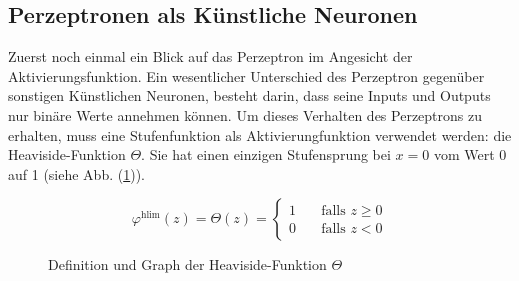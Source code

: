 \subsection{Perzeptronen als Künstliche Neuronen}
Zuerst noch einmal ein Blick auf das Perzeptron im Angesicht der Aktivierungsfunktion.
Ein wesentlicher Unterschied des Perzeptron gegenüber sonstigen Künstlichen
Neuronen, besteht darin, dass seine Inputs und Outputs nur binäre Werte
annehmen können. Um dieses Verhalten des Perzeptrons zu erhalten,
muss eine Stufenfunktion als Aktivierungfunktion verwendet werden: die Heaviside-Funktion $\Theta$.
Sie hat einen einzigen Stufensprung bei $x=0$ vom Wert 0 auf 1 (siehe Abb. (\ref{fig:heaviside})).
\\
\begin{figure}[h!]
  \begin{minipage}[h!]{0.5\textwidth}
    \begin{equation*}
      \varphi^{\text{hlim}}(z) = \Theta(z) =
      \begin{cases}
        1 & \quad \text{falls } z \geq 0\\
        0 & \quad \text{falls } z < 0
      \end{cases}
    \end{equation*}
  \end{minipage}
  \begin{minipage}[h!]{0.5\textwidth}
    \centering
  \end{minipage}
  \caption{Definition und Graph der Heaviside-Funktion $\Theta$}
  \label{fig:heaviside}
\end{figure}

